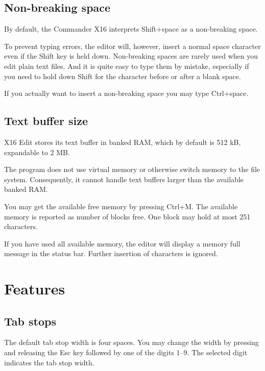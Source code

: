 \documentclass{article}
\begin{document}
	\subsection{Non-breaking space}

        By default, the Commander X16 interprets Shift+space as a non-breaking space. 
        
        To prevent typing errors, the editor will, however, insert a normal space character even if the Shift key is held down.
        Non-breaking spaces are rarely used when you edit plain text files. And it is quite easy to type them by mistake,
        especially if you need to hold down Shift for the character before or after a blank space.

        If you actually want to insert a non-breaking space you may type Ctrl+space.

    \subsection{Text buffer size}

        X16 Edit stores its text buffer in banked RAM, which by default is 512 kB,
        expandable to 2 MB. 
        
        The program does not use virtual memory or otherwise
        switch memory to the file system. Consequently, it cannot handle text
        buffers larger than the available banked RAM.

        You may get the available free memory by pressing Ctrl+M. The available memory is 
        reported as number of blocks free. One block may hold at most 251 characters.

        If you have used all available memory, the editor will display a memory
        full message in the status bar. Further insertion of characters is ignored.

\section{Features}

    \subsection{Tab stops}

        The default tab stop width is four spaces. You may change the width by pressing and releasing the Esc key followed
        by one of the digits 1--9. The selected digit indicates the tab stop width.
        
\end{document}
